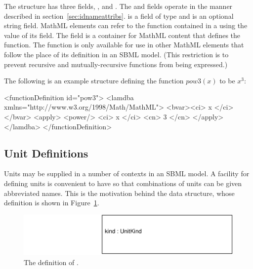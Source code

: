 \documentclass[10pt,twocolumntoc]{cekarticle}
\newcommand{\vref}[1]{\ref{#1}}
\begin{document}
The  structure has three fields, ,
 and .  The  and 
fields operate in the manner described in section~\ref{sec:idnameattribs}.
 is a field of type  and  is an optional
string field.  MathML elements can refer to the function contained in a
 using the value of its  field.  The
 field is a container for MathML content that defines the
function.  The function is only available for use in other MathML elements
that follow the place of its definition in an SBML model.  (This
restriction is to prevent recursive and mutually-recursive functions from
being expressed.)

The following is an example  structure defining
the function $pow3(x)$ to be $x^{3}$:

\begin{example}
<functionDefinition id="pow3">
    <lamdba xmlns="http://www.w3.org/1998/Math/MathML">
        <bvar><ci> x </ci></bvar>
        <apply>
            <power/>
            <ci> x </ci>
            <cn> 3 </cn>
        </apply>
    </lamdba>
</functionDefinition>
\end{example}

\subsection{Unit Definitions}
\label{sec:unitdefinitions}

Units may be supplied in a number of contexts in an SBML model.  A
facility for defining units is convenient to have so that
combinations of units can be given abbreviated names.  This is the
motivation behind the  data structure, whose
definition is shown in Figure~\vref{fig:unitdefinition}.

\begin{figure}[htb]
  \centering
  \includegraphics[scale = 0.68]{unitdefinition}
  \caption{The definition of .}
  \label{fig:unitdefinition}
\end{figure}
\end{document}
